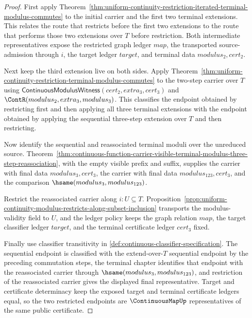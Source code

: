 \begin{proof}
First apply Theorem~\ref{thm:uniform-continuity-restriction-iterated-terminal-modulus-commutes} to the initial carrier and the first two terminal extensions. This relates the route that restricts before the first two extensions to the route that performs those two extensions over $T$ before restriction. Both intermediate representatives expose the restricted graph ledger $map$, the transported source-admission through $i$, the target ledger $target$, and terminal data $modulus_2,cert_2$.

Next keep the third extension live on both sides. Apply Theorem~\ref{thm:uniform-continuity-restriction-terminal-modulus-commutes} to the two-step carrier over $T$ using $\mathsf{ContinuousModulusWitness}(cert_2,extra_3,cert_3)$ and $\ContR(modulus_2,extra_3,modulus_3)$. This classifies the endpoint obtained by restricting first and then applying all three terminal extensions with the endpoint obtained by applying the sequential three-step extension over $T$ and then restricting.

Now identify the sequential and reassociated terminal moduli over the unreduced source. Theorem~\ref{thm:continuous-function-carrier-visible-terminal-modulus-three-step-reassociation}, with the empty visible prefix and suffix, supplies the carrier with final data $modulus_3,cert_3$, the carrier with final data $modulus_{123},cert_3$, and the comparison $\hsame(modulus_3,modulus_{123})$.

Restrict the reassociated carrier along $i:U\subseteq T$. Proposition~\ref{prop:uniform-continuity-modulus-restricts-along-subset-inclusion} transports the modulus-validity field to $U$, and the ledger policy keeps the graph relation $map$, the target classifier ledger $target$, and the terminal certificate ledger $cert_3$ fixed.

Finally use classifier transitivity in \autoref{def:continuous-classifier-specification}. The sequential endpoint is classified with the extend-over-$T$ sequential endpoint by the preceding commutation steps, the terminal chapter identifies that endpoint with the reassociated carrier through $\hsame(modulus_3,modulus_{123})$, and restriction of the reassociated carrier gives the displayed final representative. Target and certificate determinacy keep the exposed target and terminal certificate ledgers equal, so the two restricted endpoints are $\ContinuousMapUp$ representatives of the same public certificate.


\end{proof}
